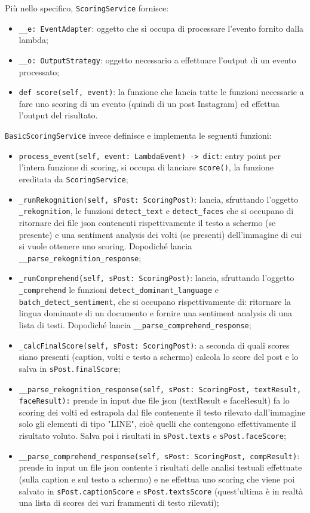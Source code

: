 Più nello specifico, \verb+ScoringService+ fornisce:
\begin{itemize}
    \item \verb+__e: EventAdapter+: oggetto che si occupa di processare l'evento fornito 
    dalla lambda;
    \item \verb+__o: OutputStrategy+: oggetto necessario a effettuare l'output di un evento processato;
    \item \verb+def score(self, event)+: la funzione che lancia tutte le funzioni necessarie a
    fare uno scoring di un evento (quindi di un post Instagram) ed effettua l'output del risultato.
\end{itemize}
\verb+BasicScoringService+ invece definisce e implementa le seguenti funzioni:
\begin{itemize}
    \item \verb+process_event(self, event: LambdaEvent) -> dict+: entry point per l'intera funzione 
    di scoring, si occupa di lanciare \verb+score()+, la funzione ereditata da \verb+ScoringService+;
    \item \verb+_runRekognition(self, sPost: ScoringPost)+: lancia, sfruttando l'oggetto \verb+_rekognition+,
    le funzioni \verb+detect_text+ e \verb+detect_faces+ che si occupano di ritornare dei file json
    contenenti rispettivamente il testo a schermo (se presente) e una sentiment analysis dei volti
    (se presenti) dell'immagine di cui si vuole ottenere uno scoring.
    Dopodiché lancia \verb+__parse_rekognition_response+;
    \item \verb+_runComprehend(self, sPost: ScoringPost)+: lancia, sfruttando l'oggetto \verb+_comprehend+
    le funzioni \verb+detect_dominant_language+ e \verb+batch_detect_sentiment+, che si occupano rispettivamente
    di: ritornare la lingua dominante di un documento e fornire una sentiment analysis di una lista di testi.
    Dopodiché  lancia \verb+__parse_comprehend_response+;
    \item \verb+_calcFinalScore(self, sPost: ScoringPost)+: a seconda di quali scores siano 
    presenti (caption, volti e testo a schermo) calcola lo score del post e lo salva in \verb+sPost.finalScore+;
    \item \verb+__parse_rekognition_response(self, sPost: ScoringPost, textResult, faceResult):+ prende
    in input due file json (textResult e faceResult) fa lo scoring dei volti ed estrapola dal file 
    contenente il testo rilevato dall'immagine solo gli elementi di tipo "LINE", cioè quelli che contengono
    effettivamente il risultato voluto.
    Salva poi i risultati in \verb+sPost.texts+ e \verb+sPost.faceScore+;
    \item \verb+__parse_comprehend_response(self, sPost: ScoringPost, compResult)+: prende in input un
    file json contente i risultati delle analisi testuali effettuate (sulla caption e sul testo a schermo)
    e ne effettua uno scoring che viene poi salvato in \verb+sPost.captionScore+ e \verb+sPost.textsScore+ 
    (quest'ultima è in realtà una lista di scores dei vari frammenti di testo rilevati);
    

\end{itemize}
